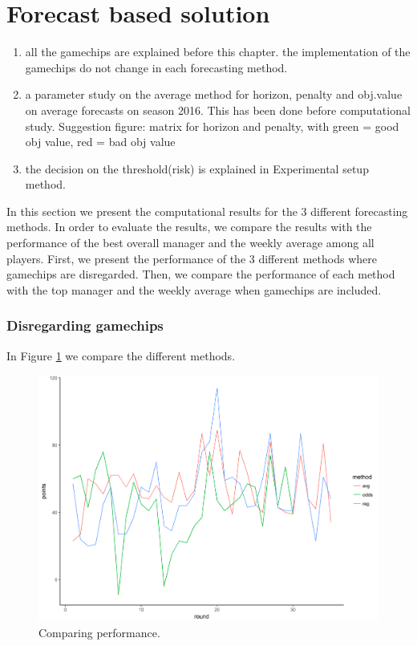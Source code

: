 \section{Forecast based solution}\label{sec:inexact}
\begin{enumerate}
    \item all the gamechips are explained before this chapter. the implementation of the gamechips do not change in each forecasting method. 
    \item a parameter study on the average method for horizon, penalty and obj.value on average forecasts on season 2016. This has been done before computational study. Suggestion figure: matrix for horizon and penalty, with green = good obj value, red = bad obj value
    \item  the decision on the threshold(risk) is explained in Experimental setup method. 
\end{enumerate}

In this section we present the computational results for the 3 different forecasting methods. In order to evaluate the results, we compare the results with the performance of the best overall manager and the weekly average among all players. First, we present the performance of the 3 different methods where gamechips are disregarded. Then, we compare the performance of each method with the top manager and the weekly average when gamechips are included.  

\subsubsection{Disregarding gamechips}

In Figure \ref{fig:comp_method} we compare the different methods. 

\begin{figure}[H]
    \centering
    \includegraphics[scale=0.5]{fig/chapter_7/comparison_methods.png}
    \caption{Comparing performance.}
\label{fig:comp_method}    
\end{figure}

